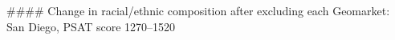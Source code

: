 #### Change in racial/ethnic composition after excluding each Geomarket: San Diego, PSAT score 1270–1520
